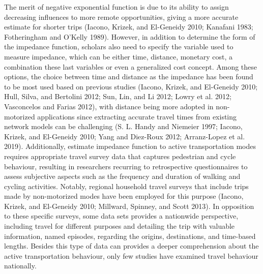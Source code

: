 \documentclass[preprint, 3p,
authoryear]{elsarticle} %
\begin{document}
The merit of negative exponential function is due to its ability to
assign decreasing influences to more remote opportunities, giving a more
accurate estimate for shorter trips (Iacono, Krizek, and El-Geneidy
2010; Kanafani 1983; Fotheringham and O'Kelly 1989). However, in
addition to determine the form of the impedance function, scholars also
need to specify the variable used to measure impedance, which can be
either time, distance, monetary cost, a combination these last variables
or even a generalized cost concept. Among these options, the choice
between time and distance as the impedance has been found to be most
used based on previous studies (Iacono, Krizek, and El-Geneidy 2010;
Hull, Silva, and Bertolini 2012; Sun, Lin, and Li 2012; Lowry et al.
2012; Vasconcelos and Farias 2012), with distance being more adopted in
non-motorized applications since extracting accurate travel times from
existing network models can be challenging (S. L. Handy and Niemeier
1997; Iacono, Krizek, and El-Geneidy 2010; Yang and Diez-Roux 2012;
Arranz-Lopez et al. 2019). Additionally, estimate impedance function to
active transportation modes requires appropriate travel survey data that
captures pedestrian and cycle behaviour, resulting in researchers
recurring to retrospective questionnaires to assess subjective aspects
such as the frequency and duration of walking and cycling activities.
Notably, regional household travel surveys that include trips made by
non-motorized modes have been employed for this purpose (Iacono, Krizek,
and El-Geneidy 2010; Millward, Spinney, and Scott 2013). In opposition
to these specific surveys, some data sets provides a nationwide
perspective, including travel for different purposes and detailing the
trip with valuable information, named episodes, regarding the origins,
destinations, and time-based lengths. Besides this type of data can
provides a deeper comprehension about the active transportation
behaviour, only few studies have examined travel behaviour nationally.
\end{document}
